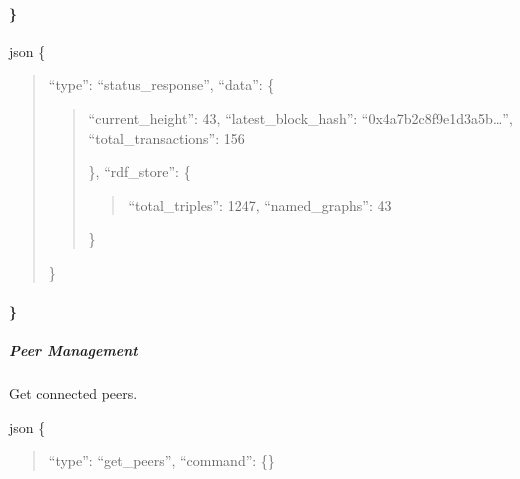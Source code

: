 \documentclass[letterpaper,10pt,english]{sphinxmanual}
\begin{document}
\paragraph{\}}
\label{\detokenize{api/websocket-api:id100}}
\sphinxAtStartPar
{}
{\color{red}\bfseries{}\textasciigrave{}\textasciigrave{}}{\color{red}\bfseries{}\textasciigrave{}}json
\{
\begin{quote}

\sphinxAtStartPar
“type”: “status\_response”,
“data”: \{
\begin{quote}
\begin{description}
\sphinxAtStartPar
“current\_height”: 43,
“latest\_block\_hash”: “0x4a7b2c8f9e1d3a5b…”,
“total\_transactions”: 156

\end{description}

\sphinxAtStartPar
\},
“rdf\_store”: \{
\begin{quote}

\sphinxAtStartPar
“total\_triples”: 1247,
“named\_graphs”: 43
\end{quote}

\sphinxAtStartPar
\}
\end{quote}

\sphinxAtStartPar
\}
\end{quote}


\paragraph{\}}
\label{\detokenize{api/websocket-api:id105}}

\subparagraph{Peer Management}
\label{\detokenize{api/websocket-api:peer-management}}
\sphinxAtStartPar
Get connected peers.

\sphinxAtStartPar
{}
{\color{red}\bfseries{}\textasciigrave{}\textasciigrave{}}{\color{red}\bfseries{}\textasciigrave{}}json
\{
\begin{quote}

\sphinxAtStartPar
“type”: “get\_peers”,
“command”: \{\}
\end{quote}
\end{document}
